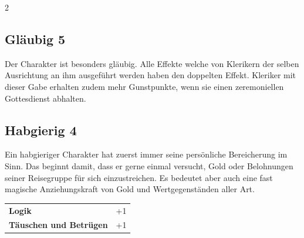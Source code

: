 \begin{multicols}{2}
\begin{tcolorbox}

\end{tcolorbox}

\begin{tcolorbox}
    \subsection*{Gläubig \hfill \small{5 }}
    \tcblower
Der Charakter ist besonders gläubig. Alle Effekte welche von Klerikern der selben Ausrichtung an ihm ausgeführt werden haben den doppelten Effekt. Kleriker mit dieser Gabe erhalten zudem mehr Gunstpunkte, wenn sie einen zeremoniellen Gottesdienst abhalten.


\vspace{3mm}



\end{tcolorbox}

\begin{tcolorbox}
    \subsection*{Habgierig \hfill \small{4 }}
    \tcblower
Ein habgieriger Charakter hat zuerst immer seine persönliche Bereicherung im Sinn. Das beginnt damit, dass er gerne einmal versucht, Gold oder Belohnungen seiner Reisegruppe für sich einzustreichen. Es bedeutet aber auch eine fast magische Anziehungskraft von Gold und Wertgegenständen aller Art.


\vspace{3mm}

\begin{tabular}{@{}ll@{}}
    \textbf{Logik} & +1\\
    \textbf{Täuschen und Betrügen} & +1\\
\end{tabular}


\end{tcolorbox}

\begin{tcolorbox}

\end{tcolorbox}
\end{multicols}
